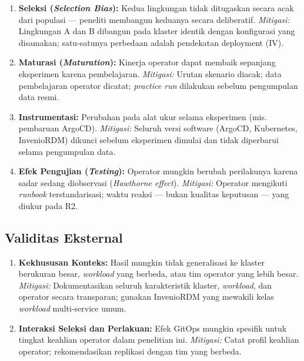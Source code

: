 \begin{enumerate}
    \item \textbf{Seleksi (\textit{Selection Bias}):} Kedua lingkungan tidak ditugaskan secara acak dari populasi --- peneliti membangun keduanya secara deliberatif. \textit{Mitigasi:} Lingkungan A dan B dibangun pada klaster identik dengan konfigurasi yang disamakan; satu-satunya perbedaan adalah pendekatan deployment (IV).
    
    \item \textbf{Maturasi (\textit{Maturation}):} Kinerja operator dapat membaik sepanjang eksperimen karena pembelajaran. \textit{Mitigasi:} Urutan skenario diacak; data pembelajaran operator dicatat; \textit{practice run} dilakukan sebelum pengumpulan data resmi.
    
    \item \textbf{Instrumentasi:} Perubahan pada alat ukur selama eksperimen (mis. pembaruan ArgoCD). \textit{Mitigasi:} Seluruh versi software (ArgoCD, Kubernetes, InvenioRDM) dikunci sebelum eksperimen dimulai dan tidak diperbarui selama pengumpulan data.
    
    \item \textbf{Efek Pengujian (\textit{Testing}):} Operator mungkin berubah perilakunya karena sadar sedang diobservasi (\textit{Hawthorne effect}). \textit{Mitigasi:} Operator mengikuti \textit{runbook} terstandarisasi; waktu reaksi --- bukan kualitas keputusan --- yang diukur pada R2.
\end{enumerate}

\subsection{Validitas Eksternal}

\begin{enumerate}
    \item \textbf{Kekhususan Konteks:} Hasil mungkin tidak generalisasi ke klaster berukuran besar, \textit{workload} yang berbeda, atau tim operator yang lebih besar. \textit{Mitigasi:} Dokumentasikan seluruh karakteristik klaster, \textit{workload}, dan operator secara transparan; gunakan InvenioRDM yang mewakili kelas \textit{workload} multi-service umum.
    
    \item \textbf{Interaksi Seleksi dan Perlakuan:} Efek GitOps mungkin spesifik untuk tingkat keahlian operator dalam penelitian ini. \textit{Mitigasi:} Catat profil keahlian operator; rekomendasikan replikasi dengan tim yang berbeda.
\end{enumerate}

